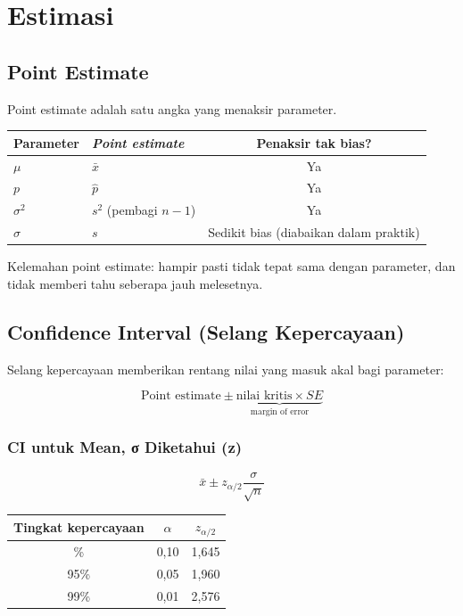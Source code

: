\documentclass[
  indonesian,
  letterpaper,
]{book}
\newcounter{none} %
\begin{document}

\chapter{Estimasi}\label{estimasi}

\section{Point Estimate}\label{point-estimate}

Point estimate adalah satu angka yang menaksir parameter.

{\def\LTcaptype{none} %
\begin{longtable}[]{@{}llc@{}}
\toprule\noalign{}
Parameter & \emph{Point estimate} & Penaksir tak bias? \\
\midrule\noalign{}
\endhead
\bottomrule\noalign{}
\endlastfoot
\(\mu\) & \(\bar{x}\) & Ya \\
\(p\) & \(\widehat{p}\) & Ya \\
\(\sigma^2\) & \(s^2\) (pembagi \(n - 1\)) & Ya \\
\(\sigma\) & \(s\) & Sedikit bias (diabaikan dalam praktik) \\
\end{longtable}
}

Kelemahan point estimate: hampir pasti tidak tepat sama dengan
parameter, dan tidak memberi tahu seberapa jauh melesetnya.

\section{Confidence Interval (Selang
Kepercayaan)}\label{confidence-interval-selang-kepercayaan}

Selang kepercayaan memberikan rentang nilai yang masuk akal bagi
parameter:

\[\text{Point estimate} \pm \underbrace{\text{nilai kritis} \times SE}_{\text{margin of error}}\]

\subsection{CI untuk Mean, σ Diketahui
(z)}\label{ci-untuk-mean-ux3c3-diketahui-z}

\[\bar{x} \pm z_{\alpha/2} \frac{\sigma}{\sqrt{n}}\]

{\def\LTcaptype{none} %
\begin{longtable}[]{@{}ccc@{}}
\toprule\noalign{}
Tingkat kepercayaan & \(\alpha\) & \(z_{\alpha/2}\) \\
\midrule\noalign{}
\endhead
\bottomrule\noalign{}
\endlastfoot
90\% & 0,10 & 1,645 \\
95\% & 0,05 & 1,960 \\
99\% & 0,01 & 2,576 \\
\end{longtable}
}
\end{document}
